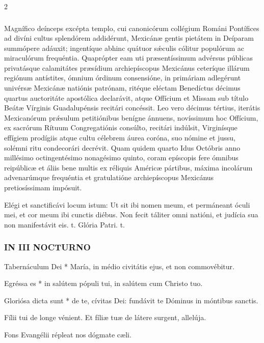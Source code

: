 \documentclass[9pt,twoside]{extarticle}
\begin{document}
\begin{multicols}{2}
\subsubsection*{\center {}}
\lettrine{M}agnífico deínceps excépta templo, cui canonicórum collégium Románi Pontífices ad divíni cultus splendórem addidérunt, Mexicánæ gentis pietátem in Deíparam summópere adáuxit; ingentíque abhinc quátuor sǽculis cólitur populórum ac miraculórum frequéntia. Quaprópter eam uti præsentíssimum advérsus públicas privatásque calamitátes præsídium archiepíscopus Mexicánus ceteríque illárum regiónum antístites, ómnium órdinum consensióne, in primáriam adlegérunt univérsæ Mexicánæ natiónis patrónam, ritéque eléctam Benedíctus décimus quartus auctoritáte apostólica declarávit, atque Offícium et Missam sub título Beátæ Vírginis Guadalupénsis recitári concéssit. Leo vero décimus tértius, iterátis Mexicanórum prǽsulum petitiónibus benígne ánnuens, novíssimum hoc Offícium, ex sacrórum Rítuum Congregatiónis consúlto, recitári indúlsit, Virginísque effígiem prodígiis atque cultu célebrem áurea coróna, suo nómine et jussu, solémni ritu condecorári decrévit. Quam quidem quarto Idus Octóbris anno millésimo octingentésimo nonagésimo quinto, coram epíscopis fere ómnibus reipúblicæ et áliis bene multis ex réliquis Américæ pártibus, máxima incolárum advenarúmque frequéntia et gratulatióne archiepíscopus Mexicánus pretiosíssimam impósuit.

\begin{tightlist}{}
\item {} Elégi et sanctificávi locum istum: \textred{*} Ut sit ibi nomen meum, et permáneant óculi mei, et cor meum ibi cunctis diébus.
 Non fecit táliter omni natióni, et judícia sua non manifestávit eis. t. Glória Patri. t.
\end{tightlist}

\subsubsection*{\center \textsc{IN III NOCTURNO}}
\begin{tightlist}{}
\item {} Tabernáculum Dei * María, in médio civitátis ejus, et non commovébitur.
\item {} Egréssa es * in salútem pópuli tui, in salútem cum Christo tuo.
\item {} Gloriósa dicta sunt * de te, cívitas Dei: fundávit te Dóminus in móntibus sanctis.
\item {} Fílii tui de longe vénient.  Et fíliæ tuæ de látere surgent, allelúja.
\item {\small {} Fons Evangélii répleat nos dógmate cæli.}
\end{tightlist}


\end{multicols}
\end{document}
